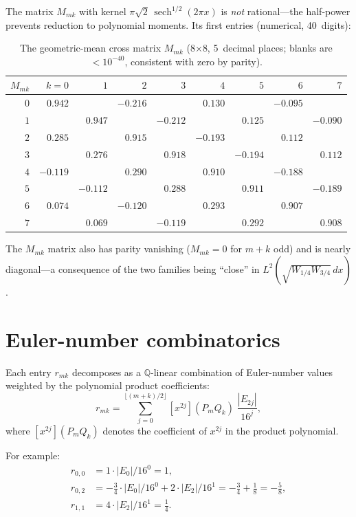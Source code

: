 \documentclass[11pt,a4paper]{article}
\newcommand{\Q}{\mathbb{Q}}
\begin{document}
The matrix $M_{mk}$ with kernel
$\pi\sqrt{2}\,\operatorname{sech}^{1/2}(2\pi x)$ is
\emph{not} rational---the half-power prevents reduction to
polynomial moments. Its first entries (numerical, 40~digits):

\begin{table}[ht]
\centering
\caption{The geometric-mean cross matrix $M_{mk}$ (8$\times$8,
  5~decimal places; blanks are $<10^{-40}$, consistent with zero by parity).}
\label{tab:Mmk}
\small
\begin{tabular}{r|rrrrrrrr}
\toprule
$M_{mk}$ & $k{=}0$ & $1$ & $2$ & $3$ & $4$ & $5$ & $6$ & $7$ \\
\midrule
$0$ & $0.942$ && $-0.216$ && $0.130$ && $-0.095$ \\
$1$ && $0.947$ && $-0.212$ && $0.125$ && $-0.090$ \\
$2$ & $0.285$ && $0.915$ && $-0.193$ && $0.112$ \\
$3$ && $0.276$ && $0.918$ && $-0.194$ && $0.112$ \\
$4$ & $-0.119$ && $0.290$ && $0.910$ && $-0.188$ \\
$5$ && $-0.112$ && $0.288$ && $0.911$ && $-0.189$ \\
$6$ & $0.074$ && $-0.120$ && $0.293$ && $0.907$ \\
$7$ && $0.069$ && $-0.119$ && $0.292$ && $0.908$ \\
\bottomrule
\end{tabular}
\end{table}

The $M_{mk}$ matrix also has parity vanishing ($M_{mk} = 0$ for
$m+k$ odd) and is nearly diagonal---a consequence of the two
families being ``close'' in $L^2(\sqrt{W_{1/4}W_{3/4}}\,dx)$.

\section{Euler-number combinatorics}\label{sec:comb}

Each entry $r_{mk}$ decomposes as a $\Q$-linear combination of
Euler-number values weighted by the polynomial product
coefficients:
\[
  r_{mk} = \sum_{j=0}^{\lfloor(m+k)/2\rfloor}
    [x^{2j}](P_m Q_k)\;\frac{|E_{2j}|}{16^j},
\]
where $[x^{2j}](P_m Q_k)$ denotes the coefficient of $x^{2j}$ in
the product polynomial.

For example:
\begin{align*}
  r_{0,0} &= 1\cdot|E_0|/16^0 = 1, \\
  r_{0,2} &= -\tfrac34\cdot|E_0|/16^0
           + 2\cdot|E_2|/16^1 = -\tfrac34 + \tfrac18 = -\tfrac58, \\
  r_{1,1} &= 4\cdot|E_2|/16^1 = \tfrac14.
\end{align*}
\end{document}
